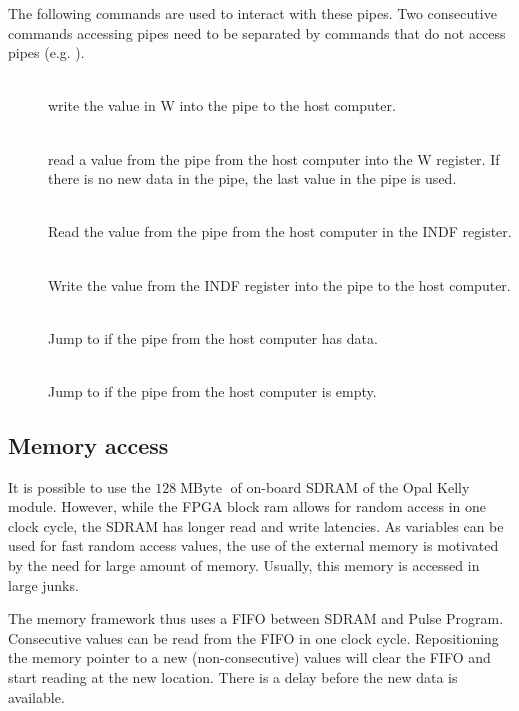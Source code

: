\documentclass[11pt]{scrartcl}
\newcommand{\unit}[1]{\ensuremath{\operatorname{#1}}}
\begin{document}
The following commands are used to interact with these pipes. Two consecutive commands accessing pipes need to be separated by commands that do not access pipes (e.g. ).

\begin{addmargin}{1cm}
\begin{description}
\item[]  \hfill\\  
write the value in W into the pipe to the host computer. 

\item[]  \hfill\\  
read a value from the pipe from the host computer into the W register. If there is no new data in the pipe, the last value in the pipe is used.

\item[]  \hfill\\  
Read the value from the pipe from the host computer in the INDF register.

\item[]  \hfill\\  
Write the value from the INDF register into the pipe to the host computer.

\item[  ]  \hfill\\  
Jump to  if the pipe from the host computer has data.

\item[ ]  \hfill\\  
Jump to  if the pipe from the host computer is empty.
\end{description}
\end{addmargin}

\subsection{Memory access}
It is possible to use the $128 \unit{MByte}$ of on-board SDRAM of the Opal Kelly module. However, while the FPGA block ram allows for random access in one clock cycle, the SDRAM has longer read and write latencies. As variables can be used for fast random access values, the use of the external memory is motivated by the need for large amount of memory. Usually, this memory is accessed in large junks. 

The memory framework thus uses a FIFO between SDRAM and Pulse Program. Consecutive values can be read from the FIFO in one clock cycle. Repositioning the memory pointer to a new (non-consecutive) values will clear the FIFO and start reading at the new location. There is a delay before the new data is available.
\end{document}
